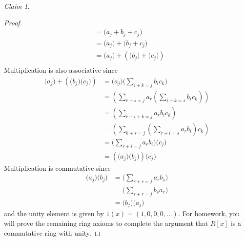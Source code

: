 \documentclass[12pt,letterpaper,DIV=11,final]{scrartcl}
\theoremstyle{plain}
\theoremstyle{definition}
\theoremstyle{remark}
\newtheorem{claim}{Claim}
\begin{document}
\begin{claim}
\begin{proof}
\begin{align*}
                                                                                                                   &= \boldsymbol( a_j + b_j + c_j \boldsymbol) \\
                                                                                                                   &= \boldsymbol( a_j \boldsymbol) + \boldsymbol( b_j + c_j \boldsymbol) \\
                                                                                                                   &= \boldsymbol( a_j \boldsymbol) + \left( \boldsymbol( b_j \boldsymbol) + \boldsymbol( c_j \boldsymbol) \right) \\
    \end{align*}
    Multiplication is also associative since
    \begin{align*}
      \boldsymbol( a_j \boldsymbol) + \left( \boldsymbol( b_j \boldsymbol) \boldsymbol( c_j \boldsymbol) \right) &= \boldsymbol( a_j \boldsymbol) \boldsymbol( \sum_{i + k = j} b_i c_k \boldsymbol) \\
                                                                                                                 &= \left( \sum_{r + s = j} a_r \left( \sum_{i + k = s} b_i c_k \right) \right) \\
                                                                                                                 &= \left( \sum_{r + i + k = j} a_r b_i c_k \right) \\
                                                                                                                 &= \left( \sum_{k + s = j} \left( \sum_{r + i = s} a_r b_i \right) c_k \right) \\
                                                                                                                 &= \boldsymbol( \sum_{r + i = j} a_r b_i \boldsymbol) \boldsymbol( c_j \boldsymbol) \\
                                                                                                                 &= \left( \boldsymbol( a_j \boldsymbol) \boldsymbol( b_j \boldsymbol) \right) \boldsymbol( c_j \boldsymbol)
    \end{align*}
    Multiplication is commutative since
    \begin{align*}
      \boldsymbol( a_j \boldsymbol) \boldsymbol( b_j \boldsymbol) &= \boldsymbol( \sum_{r + s = j} a_r b_s \boldsymbol) \\
                                                                  &= \boldsymbol( \sum_{s + r = j} b_s a_r \boldsymbol) \\
                                                                  &= \boldsymbol( b_j \boldsymbol) \boldsymbol( a_j \boldsymbol)
    \end{align*}
    and the unity element is given by $1(x) = (1, 0, 0, 0, \dots)$.
    For homework, you will prove the remaining ring axioms to complete the argument that $R[x]$ is a commutative ring with unity.
  \end{proof}
\end{claim}
\end{document}
